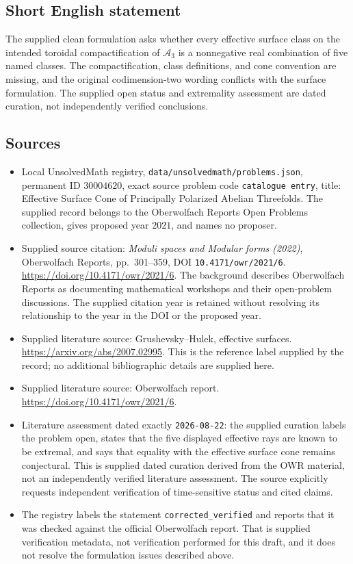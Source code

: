 \documentclass[11pt]{article}
\begin{document}
\subsection{Short English statement}
The supplied clean formulation asks whether every effective surface class on the intended toroidal compactification of \(\mathcal A_3\) is a nonnegative real combination of five named classes. The compactification, class definitions, and cone convention are missing, and the original codimension-two wording conflicts with the surface formulation. The supplied open status and extremality assessment are dated curation, not independently verified conclusions.
\subsection{Sources}
\begin{itemize}
\item Local UnsolvedMath registry, \texttt{data/unsolvedmath/problems.json}, permanent ID \(30004620\), exact source problem code \texttt{catalogue entry}, title: Effective Surface Cone of Principally Polarized Abelian Threefolds. The supplied record belongs to the Oberwolfach Reports Open Problems collection, gives proposed year \(2021\), and names no proposer.
\item Supplied source citation: \emph{Moduli spaces and Modular forms (2022)}, Oberwolfach Reports, pp.~301--359, DOI \texttt{10.4171/owr/2021/6}. \url{https://doi.org/10.4171/owr/2021/6}. The background describes Oberwolfach Reports as documenting mathematical workshops and their open-problem discussions. The supplied citation year is retained without resolving its relationship to the year in the DOI or the proposed year.
\item Supplied literature source: Grushevsky--Hulek, effective surfaces. \url{https://arxiv.org/abs/2007.02995}. This is the reference label supplied by the record; no additional bibliographic details are supplied here.
\item Supplied literature source: Oberwolfach report. \url{https://doi.org/10.4171/owr/2021/6}.
\item Literature assessment dated exactly \texttt{2026-08-22}: the supplied curation labels the problem open, states that the five displayed effective rays are known to be extremal, and says that equality with the effective surface cone remains conjectural. This is supplied dated curation derived from the OWR material, not an independently verified literature assessment. The source explicitly requests independent verification of time-sensitive status and cited claims.
\item The registry labels the statement \texttt{corrected\_verified} and reports that it was checked against the official Oberwolfach report. That is supplied verification metadata, not verification performed for this draft, and it does not resolve the formulation issues described above.
\end{itemize}
\end{document}
